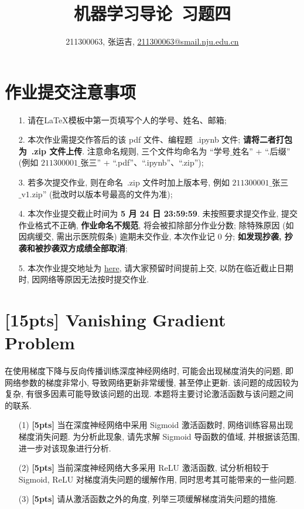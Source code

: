 \documentclass[a4paper,UTF8]{article}
\numberwithin{equation}{section}
\numberwithin{equation}{section}
\theoremstyle{definition}
\begin{document}
\title{机器学习导论\ 习题四}
\author{211300063, 张运吉, \href{mailto:邮箱}{211300063@smail.nju.edu.cn}}
\maketitle
\section*{作业提交注意事项}
\begin{tcolorbox}
	\begin{enumerate}
		\item[1.] 请在LaTeX模板中第一页填写个人的学号、姓名、邮箱;
		\item[2.] 本次作业需提交作答后的该 pdf 文件、编程题~.ipynb 文件; {\color{red}\textbf{请将二者打包为~.zip 文件上传}}. 注意命名规则, 三个文件均命名为 “$\text{学号}\_\text{姓名}$” + “.后缀” (例如 $\text{211300001}\_\text{张三}$” + “.pdf”、“.ipynb”、“.zip”);
		\item[3.] 若多次提交作业, 则在命名~.zip 文件时加上版本号, 例如 $\text{211300001}\_\text{张三}$ $\_\text{v1.zip}$” (批改时以版本号最高的文件为准);
		\item[4.] 本次作业提交截止时间为 {\color{red}\textbf{ 5 月 24 日 23:59:59}}. 未按照要求提交作业, 提交作业格式不正确, {\color{red}\textbf{作业命名不规范}}, 将会被扣除部分作业分数; 除特殊原因 (如因病缓交, 需出示医院假条) 逾期未交作业, 本次作业记 0 分; {\color{red}\textbf{如发现抄袭, 抄袭和被抄袭双方成绩全部取消}};
		\item[5.] 本次作业提交地址为 \href{https://box.nju.edu.cn/u/d/90ad71e29ef240a49e9e/}{here}, 请大家预留时间提前上交, 以防在临近截止日期时, 因网络等原因无法按时提交作业.
	\end{enumerate}
\end{tcolorbox}
\newpage


\section{[15pts] Vanishing Gradient Problem}

在使用梯度下降与反向传播训练深度神经网络时, 可能会出现梯度消失的问题, 即网络参数的梯度非常小, 导致网络更新非常缓慢, 甚至停止更新.
该问题的成因较为复杂, 有很多因素可能导致该问题的出现. 本题将主要讨论激活函数与该问题之间的联系.

\begin{enumerate}
    \item[(1)] \textbf{[5pts]} 当在深度神经网络中采用 Sigmoid 激活函数时, 网络训练容易出现梯度消失问题. 为分析此现象, 请先求解 Sigmoid 导函数的值域, 并根据该范围, 进一步对该现象进行分析.
    \item[(2)] \textbf{[5pts]} 当前深度神经网络大多采用 ReLU 激活函数, 试分析相较于 Sigmoid, ReLU 对梯度消失问题的缓解作用, 同时思考其可能带来的一些问题.
    \item[(3)] \textbf{[5pts]} 请从激活函数之外的角度, 列举三项缓解梯度消失问题的措施. 
\end{enumerate}
\end{document}
